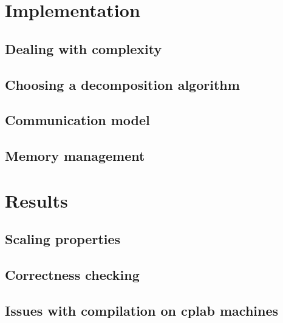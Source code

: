 \documentclass[11pt,a4paper]{article}
\begin{document}
\section{Implementation}
\subsection{Dealing with complexity}
\subsection{Choosing a decomposition algorithm}
\subsection{Communication model}
\subsection{Memory management}

\section{Results}
\subsection{Scaling properties}
\subsection{Correctness checking}
\subsection{Issues with compilation on cplab machines}
\end{document}
